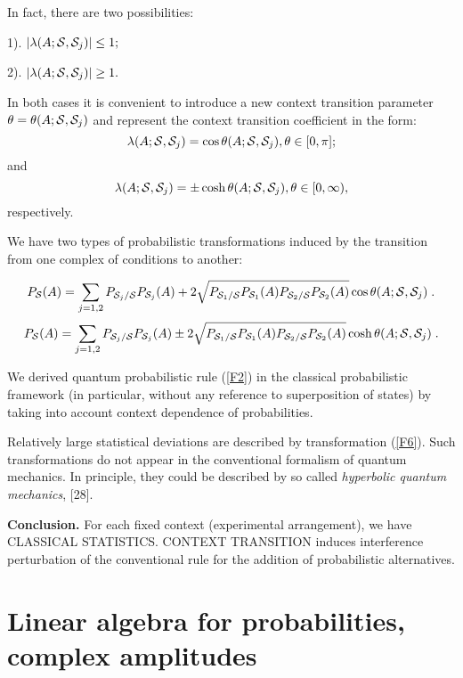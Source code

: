 \documentclass[12pt,oneside,final,a4paper]{article}
\begin{document}
In fact, there are two possibilities:

1). $|\lambda(A; {\cal S}, {\cal S}_j)|\leq 1;$

2). $|\lambda(A; {\cal S}, {\cal S}_j)|\geq 1.$

In both cases it is convenient to introduce a new context transition parameter 
$\theta= \theta(A; {\cal S}, {\cal S}_j)$ and represent
the context transition coefficient in the form:
\[\lambda(A; {\cal S}, {\cal S}_j)=\cos \theta (A; {\cal S}, {\cal S}_j) , \theta \in [0, \pi];\] 
and
\[\lambda(A; {\cal S}, {\cal S}_j)=\pm\cosh \theta (A; {\cal S}, {\cal S}_j), \theta \in [0, \infty),\]
respectively.

We have two types of probabilistic transformations induced by the transition 
from one complex of conditions to another: 

\begin{equation}
\label{F5}
P_{{\cal S}}(A)= \sum_{j=1,2} P_{{\cal S}_j/{\cal S}}  P_{{\cal S}_j}(A) +
2 \sqrt{P_{{\cal S}_1/{\cal S}}  P_{{\cal S}_1}(A)P_{{\cal S}_2/{\cal S}}  P_{{\cal S}_2}(A)} \cos \theta(A; {\cal S}, {\cal S}_j)\;.
\end{equation}
\begin{equation}
\label{F6}
P_{{\cal S}}(A)= \sum_{j=1,2} P_{{\cal S}_j/{\cal S}}  P_{{\cal S}_j}(A) \pm
2 \sqrt{P_{{\cal S}_1/{\cal S}}  P_{{\cal S}_1}(A)P_{{\cal S}_2/{\cal S}}  P_{{\cal S}_2}(A)} 
\cosh \theta(A; {\cal S}, {\cal S}_j)\;.
\end{equation}

We derived quantum probabilistic rule (\ref{F2})  in the classical probabilistic framework 
(in particular, without any reference to superposition of states) by taking into account context
dependence of probabilities. 


Relatively large statistical deviations are described by transformation (\ref{F6}). Such transformations do not 
appear in the conventional formalism of quantum mechanics. In principle, they could be described by so called 
{\it{hyperbolic quantum mechanics}}, [28].

{\bf Conclusion.} For each fixed context (experimental arrangement), we have CLASSICAL STATISTICS.
CONTEXT TRANSITION induces interference perturbation
of the conventional rule for the addition of probabilistic alternatives.


\section{Linear algebra for probabilities, complex amplitudes}
\end{document}
